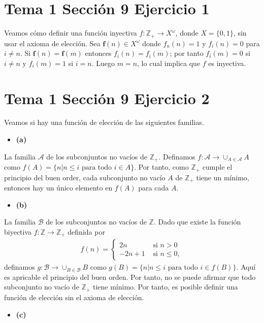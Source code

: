 \documentclass{article}
\newcommand{\vect}[1]{\boldsymbol{#1}}
\begin{document}
\section{Tema 1 Sección 9 Ejercicio 1}
Veamos cómo definir una función inyectiva $f:\mathbb{Z}_{+}\rightarrow X^{\omega}$, donde $X=\{0,1\}$, sin usar el axioma de elección. Sea $\vect{f}(n)\in X^{\omega}$ donde $f_n(n)=1$ y $f_i(n)=0$ para $i\neq n$. Si $\vect{f}(n)=\vect{f}(m)$ entonces  $f_i(n)=f_i(m)$; por tanto $f_i(m)=0$ si $i\neq n$ y $f_i(m)=1$ si $i=n$. Luego $m=n$, lo cual implica que $f$ es inyectiva.
\section{Tema 1 Sección 9 Ejercicio 2}
Veamos si hay una función de elección de las siguientes familias.
\begin{itemize}
\item \bf (a) \rm
\end{itemize}
La familia $\mathcal{A}$ de los subconjuntos no vacíos de $\mathbb{Z}_{+}$. Definamos $f:\mathcal{A}\rightarrow \cup_{A\in\mathcal{A}}A$ como
$f(A)=\{n| n\leq i \text{ para todo } i\in A \}$. Por tanto, como $\mathbb{Z}_{+}$ cumple el principio del buen order, cada subconjunto no vacío $A$ de $\mathbb{Z}_{+}$ tiene un mínimo, entonces hay un único elemento en $f(A)$ para cada $A$. 
\begin{itemize}
\item \bf (b) \rm
\end{itemize}
La familia $\mathcal{B}$ de los subconjuntos no vacíos de $\mathbb{Z}$. Dado que existe la función biyectiva $f:\mathbb{Z}\rightarrow \mathbb{Z}_{+}$ definida por 
\begin{eqnarray}
f(n)=
\begin{cases}
2n & \text{ si }n>0 \nonumber\\
-2n+1 & \text{ si }n\leq 0, \nonumber
\end{cases}
\end{eqnarray}
definamos $g:\mathcal{B}\rightarrow \cup_{B\in\mathcal{B}}B$ como
$g(B)=\{n| n\leq i \text{ para todo } i\in f(B) \}$. Aquí es apricable el principio del buen orden. Por tanto, no se puede afirmar que todo subconjunto no vacío de $\mathbb{Z}_{+}$ tiene mínimo. Por tanto, es posible definir una función de elección sin el axioma de elección.
\begin{itemize}
\item \bf (c) \rm
\end{itemize}
\end{document}
